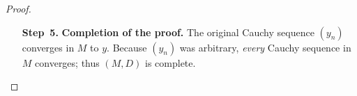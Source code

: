 \documentclass[12pt]{article}
\theoremstyle{definition} %
\theoremstyle{plain} %
\begin{document}
\begin{proof}
\begin{enumerate}
      \item[\textbf{Step 5.}] \textbf{Completion of the proof.}  
            The original Cauchy sequence $(y_n)$ converges in $M$ to $y$.
            Because $(y_n)$ was arbitrary, \emph{every} Cauchy sequence in
            $M$ converges; thus $(M,D)$ is complete.
  \end{enumerate}
\end{proof}
\end{document}
